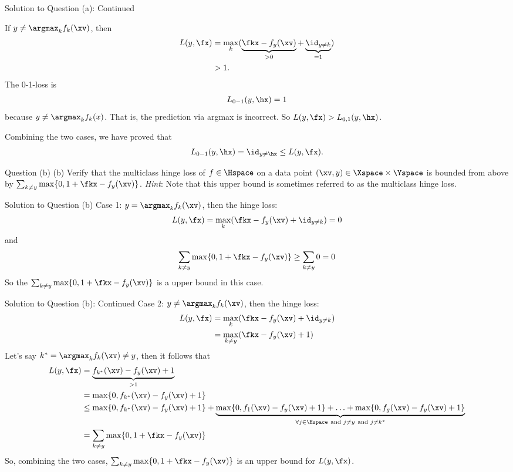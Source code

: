 \documentclass[aspectratio=169]{beamer}
\newcommand{\fyx}{f_y(\xv)}
\begin{document}
\begin{frame}{Solution to Question (a): Continued}
\small

If $y \neq \argmax_{k} f_k(\xv)$, then
\begin{align*}
	L(y, \fx) 
		&= \max_k (\underbrace{\fkx - f_y(\xv)}_{> 0} + \underbrace{\id_{y \neq k}}_{= 1}) \\
		&> 1.
\end{align*}
The 0-1-loss is 
\begin{align*}
	L_{0-1}(y, \hx) = 1
\end{align*}
because $y \neq \argmax_k f_k(x)$. That is, the prediction via argmax is incorrect. So $L(y, \fx) > L_{0, 1} (y, \hx)$.

\vspace{10pt}

Combining the two cases, we have proved that $$L_{0-1}(y, \hx) = \id_{y\neq \hx} \leq L(y, \fx).$$
\end{frame}

\begin{frame}{Question (b)}
	(b) Verify that the multiclass hinge loss of $f \in \Hspace$ on a data point $(\xv, y) \in \Xspace \times \Yspace$ is bounded from above by $\sum_{k\neq y} \max \{0, 1 + \fkx - f_y(\xv) \}$.
	\vspace{10pt}
	\emph{Hint}: Note that this upper bound is sometimes referred to as the multiclass hinge loss.
\end{frame}

\begin{frame}{Solution to Question (b)}
	\small
	Case 1: $y = \argmax_{k} f_k(\xv)$, then the hinge loss: $$L(y, \fx) = \max_k(\fkx - \fyx + \id_{y\neq k}) = 0$$
	and $$\sum_{k\neq y} \max \{0, 1 + \fkx - f_y(\xv) \} \geq \sum_{k \neq y} 0 = 0$$
	So the $\sum_{k\neq y} \max \{0, 1 + \fkx - f_y(\xv) \}$ is a upper bound in this case.
\end{frame}

\begin{frame}{Solution to Question (b): Continued}
	\small
	Case 2: $y \neq \argmax_{k} f_k(\xv)$, then the hinge loss: 
	\begin{align*}
		L(y, \fx) 
		&= \max_k(\fkx - \fyx + \id_{y\neq k}) \\
		&= \max_{k \neq y}(\fkx - \fyx + 1)
	\end{align*}
	Let's say $k^* = \argmax_{k} f_k(\xv) \neq y$, then it follows that
	\begin{align*}
		L(y, \fx) 
		&= \underbrace{f_{k^*}(\xv) - \fyx + 1}_{ > 1} \\
		&= \max\{0, f_{k^*}(\xv) - \fyx + 1\} \\
		&\leq \max\{0, f_{k^*}(\xv) - \fyx + 1\} + \underbrace{\max\{0, f_1(\xv) - \fyx + 1\} + \ldots + \max\{0, f_g(\xv) - \fyx + 1\}}_{\forall j \in \Hspace \ \text{and } j \neq y \ \text{and } j \neq k^*} \\
		&= \sum_{k \neq y} \max \{0, 1 + \fkx - \fyx\}
	\end{align*}
	So, combining the two cases, $\sum_{k \neq y} \max \{0, 1 + \fkx - \fyx\}$ is an upper bound for $L(y, \fx)$.
\end{frame}
\end{document}
